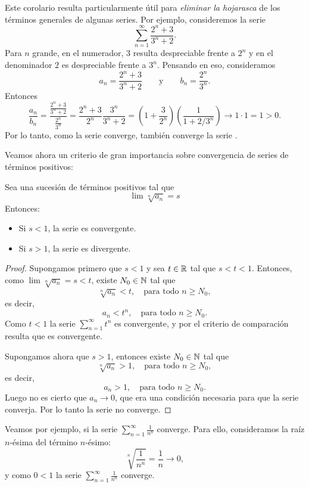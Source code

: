 Este corolario resulta particularmente útil para \emph{eliminar la hojarasca} de los términos generales de algunas series. Por ejemplo, consideremos la serie
\[
\sum_{n=1}^\infty \frac{2^n+3}{3^n+2}.
\]
Para $n$ grande, en el numerador, $3$ resulta despreciable frente a $2^n$ y en el denominador $2$ es despreciable frente a $3^n$. Pensando en eso, consideramos 
\[
a_n = \frac{2^n+3}{3^n+2}\qquad\text{y}\qquad
b_n = \frac{2^n}{3^n}.
\]
Entonces
\[
\frac{a_n}{b_n} = \frac{\frac{2^n+3}{3^n+2}}{\frac{2^n}{3^n}}
= \frac{2^n+3}{2^n}\frac{3^n}{3^n+2}
= \left(1+\frac{3}{2^n}\right) \left(\frac{1}{1+2/3^n}\right)
\to 1 \cdot 1 = 1> 0.
\]
Por lo tanto, como la serie \seriebn converge, también converge la serie \seriean.

Veamos ahora un criterio de gran importancia sobre convergencia de series de términos positivos:

\begin{proposition}
    Sea \sucan una sucesión de términos positivos tal que
    \[
    \lim \sqrt[n]{a_n} = s
    \]
Entonces:
\begin{itemize}
    \item Si $s<1$, la serie \seriean es convergente.
    \item Si $s>1$, la serie \seriean es divergente.
\end{itemize}
\end{proposition}

\begin{proof}
    Supongamos primero que $s<1$ y sea $t\in\mathbb{R}$ tal que $s<t<1$.
    Entonces, como $\lim \sqrt[n]{a_n} = s < t$, existe $N_0\in\mathbb{N}$ tal que 
    \[
    \sqrt[n]{a_n} < t, \quad \text{para todo $n\ge N_0$},
    \]
    es decir,
    \[
    a_n < t^n, \quad \text{para todo $n\ge N_0$}.
    \]
    Como $t<1$ la serie $\sum_{n=1}^\infty t^n$ es convergente, y por el criterio de comparación resulta que \seriean es convergente.

    Supongamos ahora que $s>1$, entonces existe $N_0\in\mathbb{N}$ tal que 
    \[
    \sqrt[n]{a_n} > 1, \quad \text{para todo $n\ge N_0$},
    \]
    es decir,
    \[
    a_n > 1, \quad \text{para todo $n\ge N_0$}.
    \]
    Luego no es cierto que $a_n \to 0$, que era una condición necesaria para que la serie \seriean converja.
    Por lo tanto la serie \seriean no converge.
\end{proof}


Veamos por ejemplo, si la serie $\sum_{n=1}^\infty \frac{1}{n^n}$ converge. Para ello, consideramos la raíz $n$-ésima del término $n$-ésimo:
\[
\sqrt[n]{\frac{1}{n^n}}
= \frac1n \to 0,
\]
y como $0<1$ la serie $\sum_{n=1}^\infty \frac{1}{n^n}$ converge.

